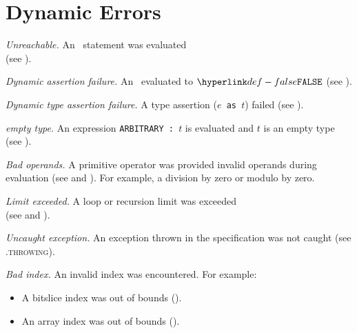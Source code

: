 \section{Dynamic Errors\label{sec:DynamicErrors}}
\begin{description}

\hypertarget{def-unreachableerror}{}
\item[$\UnreachableError$]
  \textit{Unreachable.}
  An \unreachablestatementterm\ statement was evaluated\\
    (see ).

\hypertarget{def-dynamicassertionfailure}{}
\item[$\DynamicAssertionFailure$]
  \textit{Dynamic assertion failure.}
  An \assertionstatementterm\ evaluated to $\False$
    (see ).

\hypertarget{def-dynamictypeassertionfailure}{}
\item[$\DynamicTypeAssertionFailure$]
  \textit{Dynamic type assertion failure.}
  A type assertion (\texttt{$e$ as $t$}) failed
    (see ).

\hypertarget{def-arbitraryemptytype}{}
\item[$\ArbitraryEmptyType$]
  \textit{\ARBITRARY{} empty type.}
  An expression \texttt{ARBITRARY : $t$} is evaluated and $t$ is an empty type (see ).

\hypertarget{def-dynamicbadoperands}{}
\item[$\DynamicBadOperands$]
  \textit{Bad operands.}
  A primitive operator was provided invalid operands during evaluation (see  and ).
  For example, a division by zero or modulo by zero.

\hypertarget{def-limitexceeded}{}
\item[$\LimitExceeded$]
  \textit{Limit exceeded.}
  A loop or recursion limit was exceeded \\
  (see  and ).

\hypertarget{def-uncaughtexception}{}
\item[$\UncaughtException$]
  \textit{Uncaught exception.}
  An exception thrown in the specification was not caught (see .\textsc{throwing}).

\hypertarget{def-badindex}{}
\item[$\BadIndex$]
  \textit{Bad index.}
  An invalid index was encountered.
  For example:
  \begin{itemize}
    \item A bitslice index was out of bounds ().
    \item An array index was out of bounds ().
  \end{itemize}


\end{description}

